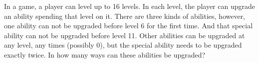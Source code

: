 In a game, a player can level up to 16 levels. In each level, the player can upgrade an ability spending that level on it. There are three kinds of abilities, however, one ability can not be upgraded before level 6 for the first time. And that special ability can not be upgraded before level 11. Other abilities can be upgraded at any level, any times (possibly 0), but the special ability needs to be upgraded exactly twice. In how many ways can these abilities be upgraded?